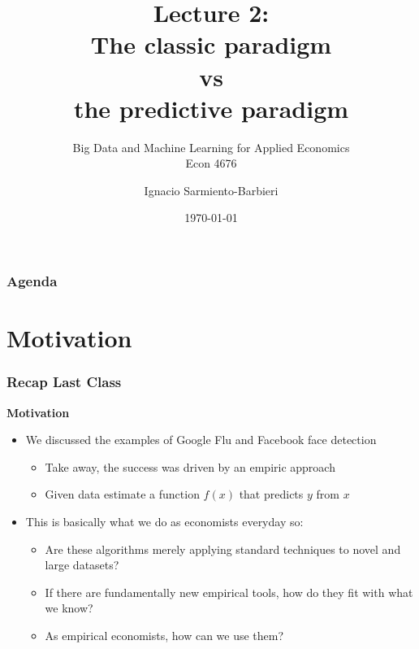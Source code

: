 \documentclass[
  shownotes,
  xcolor={svgnames},
  hyperref={colorlinks,citecolor=DarkBlue,linkcolor=DarkRed,urlcolor=DarkBlue}
  ]{beamer}
\begin{document}
\title[Lecture 2]{Lecture 2: \\ The classic paradigm \\ vs \\ the predictive paradigm}
\subtitle{Big Data and Machine Learning for Applied Economics \\ Econ 4676}
\date{\today}

\author[Sarmiento-Barbieri]{Ignacio Sarmiento-Barbieri}


\begin{frame}[noframenumbering]
\maketitle
\end{frame}





\begin{frame}
\frametitle{Agenda}

\tableofcontents


\end{frame}




\section{Motivation}
\begin{frame}
\frametitle{Recap Last Class}


{\bf Motivation}

\bigskip

\begin{itemize}
      \item We discussed the examples of Google Flu and Facebook face detection
      \medskip
      \begin{itemize}
        \item Take away, the success was driven by an empiric approach
        \item Given data  estimate a function $f(x)$ that predicts $y$ from $x$
      \end{itemize}
      \medskip
      
      \item  This is basically what we do as economists everyday so: 
      \begin{itemize}
        \item  Are these algorithms merely applying standard techniques to novel and large datasets? 
        \item  If there are fundamentally new empirical tools, how do they fit with what we know? 
        \item  As empirical economists, how can we use them? 
       \end{itemize}
\end{itemize}

\end{frame}
\end{document}
